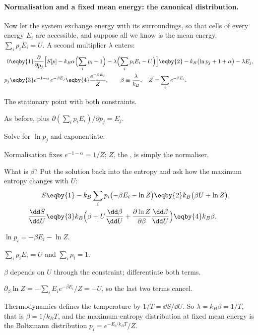 \paragraph{Normalisation and a fixed mean energy: the canonical distribution.}
Now let the system exchange energy with its surroundings, so that cells of every
energy $E_i$ are accessible, and suppose all we know is the mean energy,
$\sum_ip_iE_i=U$. A second multiplier $\lambda$ enters:
\begin{align*}
  0
  &\eqby{1}\frac{\partial}{\partial p_j}\Bigl[S[p]-k_B\alpha\Bigl(\sum_ip_i-1\Bigr)
        -\lambda\Bigl(\sum_ip_iE_i-U\Bigr)\Bigr]
   \eqby{2}-k_B\bigl(\ln p_j+1+\alpha\bigr)-\lambda E_j,
  \\
  p_j
  &\eqby{3}e^{-1-\alpha}\,e^{-\beta E_j}
   \eqby{4}\frac{e^{-\beta E_j}}{Z},
  \qquad \beta\equiv\frac{\lambda}{k_B},\quad Z=\sum_ie^{-\beta E_i}.
\end{align*}
\begin{explain}
  \item The stationary point with both constraints.
  \item As before, plus $\partial(\sum_ip_iE_i)/\partial p_j=E_j$.
  \item Solve for $\ln p_j$ and exponentiate.
  \item Normalisation fixes $e^{-1-\alpha}=1/Z$; $Z$, the , is simply the normaliser.
\end{explain}
What is $\beta$? Put the solution back into the entropy and ask how the maximum
entropy changes with $U$:
\begin{align*}
  S
  &\eqby{1}-k_B\sum_ip_i\bigl(-\beta E_i-\ln Z\bigr)
   \eqby{2}k_B\bigl(\beta U+\ln Z\bigr),
  \\
  \frac{\dd S}{\dd U}
  &\eqby{3}k_B\Bigl(\beta+U\frac{\dd\beta}{\dd U}
        +\frac{\partial\ln Z}{\partial\beta}\frac{\dd\beta}{\dd U}\Bigr)
   \eqby{4}k_B\beta .
\end{align*}
\begin{explain}
  \item $\ln p_i=-\beta E_i-\ln Z$.
  \item $\sum_ip_iE_i=U$ and $\sum_ip_i=1$.
  \item $\beta$ depends on $U$ through the constraint; differentiate both terms.
  \item $\partial_\beta\ln Z=-\sum_iE_ie^{-\beta E_i}/Z=-U$, so the last two terms
        cancel.
\end{explain}
Thermodynamics defines the temperature by $1/T=\dd S/\dd U$. So $\lambda=k_B\beta=1/T$,
that is $\beta=1/k_BT$, and the maximum-entropy distribution at fixed mean energy is
the Boltzmann distribution $p_i=e^{-E_i/k_BT}/Z$.

